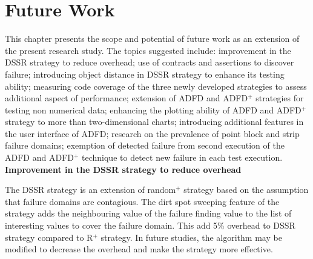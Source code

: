 
\chapter{Future Work}
\label{chap:futureWork}
	
This chapter presents the scope and potential of future work as an extension of the present research study. The topics suggested include: improvement in the DSSR strategy to reduce overhead; use of contracts and assertions to discover failure; introducing object distance in DSSR strategy to enhance its testing ability; measuring code coverage of the three newly developed strategies to assess additional aspect of performance; extension of ADFD and ADFD$^+$ strategies for testing non numerical data; enhancing the plotting ability of ADFD and ADFD$^+$ strategy to more than two-dimensional charts; introducing additional features in the user interface of ADFD; research on the prevalence of point block and strip failure domains; exemption of detected failure from second execution of the ADFD and ADFD$^+$ technique to detect new failure in each test execution. \\

	


\textbf{Improvement in the DSSR strategy to reduce overhead}

The DSSR strategy is an extension of random$^+$ strategy based on the assumption that failure domains are contagious. The dirt spot sweeping feature of the strategy adds the neighbouring value of the failure finding value to the list of interesting values to cover the failure domain. This add 5\% overhead to DSSR strategy compared to R$^+$ strategy. In future studies, the algorithm may be modified to decrease the overhead and make the strategy more effective.\\

